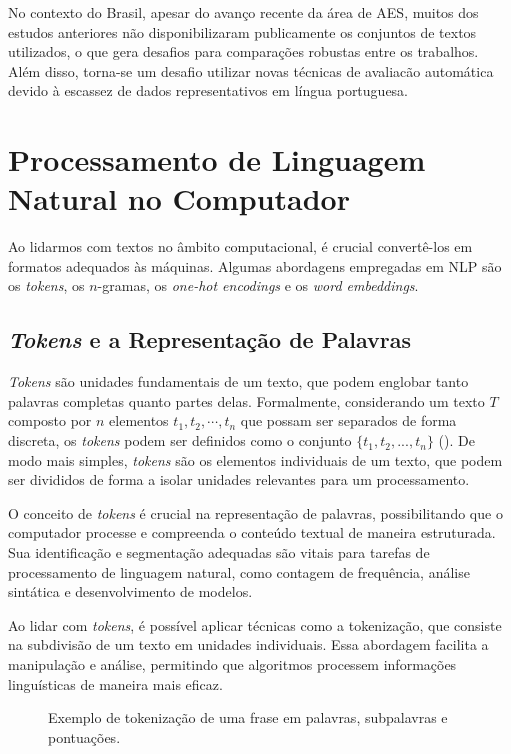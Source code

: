No contexto do Brasil, apesar do avanço recente da área de AES, muitos dos estudos anteriores não disponibilizaram publicamente os conjuntos de textos utilizados, o que gera desafios para comparações robustas entre os trabalhos. Além disso, torna-se um desafio utilizar novas técnicas de avaliacão automática devido à escassez de dados representativos em língua portuguesa.

\section{Processamento de Linguagem Natural no Computador}

Ao lidarmos com textos no âmbito computacional, é crucial convertê-los em formatos adequados às máquinas. Algumas abordagens empregadas em NLP são os \textit{tokens}, os $n$-gramas, os \textit{one-hot encodings} e os \textit{word embeddings}.

\subsection{\textit{Tokens} e a Representação de Palavras}

\textit{Tokens} são unidades fundamentais de um texto, que podem englobar tanto palavras completas quanto partes delas. Formalmente, considerando um texto $T$ composto por $n$ elementos $t_1, t_2, \cdots, t_n$ que possam ser separados de forma discreta, os \textit{tokens} podem ser definidos como o conjunto $\{t_1, t_2, ..., t_n\}$ (\cite{manning-schuetze-1999}). De modo mais simples, \textit{tokens} são os elementos individuais de um texto, que podem ser divididos de forma a isolar unidades relevantes para um processamento.

O conceito de \textit{tokens} é crucial na representação de palavras, possibilitando que o computador processe e compreenda o conteúdo textual de maneira estruturada. Sua identificação e segmentação adequadas são vitais para tarefas de processamento de linguagem natural, como contagem de frequência, análise sintática e desenvolvimento de modelos.

Ao lidar com \textit{tokens}, é possível aplicar técnicas como a tokenização, que consiste na subdivisão de um texto em unidades individuais. Essa abordagem facilita a manipulação e análise, permitindo que algoritmos processem informações linguísticas de maneira mais eficaz.

\begin{figure}[H]
    \centering
    \caption{Exemplo de tokenização de uma frase em palavras, subpalavras e pontuações.}
    \label{fig:tokenizacao}
    
\end{figure}

